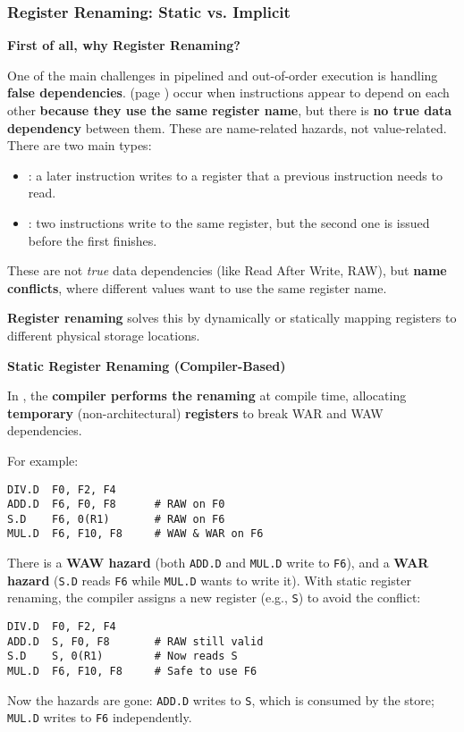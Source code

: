 \subsubsection{Register Renaming: Static vs. Implicit}\label{subsubsection: static vs implicit register renaming}

\begin{flushleft}
    \textcolor{Green3}{ \textbf{First of all, why Register Renaming?}}
\end{flushleft}
One of the main challenges in pipelined and out-of-order execution is handling \textbf{false dependencies}.  (page \pageref{subsubsection: Name Dependencies}) occur when instructions appear to depend on each other \textbf{because they use the same register name}, but there is \textbf{no true data dependency} between them. These are name-related hazards, not value-related. There are two main types:
\begin{itemize}
    \item {}: a later instruction writes to a register that a previous instruction needs to read.
    \item {}: two instructions write to the same register, but the second one is issued before the first finishes.
\end{itemize}
These are not \emph{true} data dependencies (like Read After Write, RAW), but \textbf{name conflicts}, where different values want to use the same register name.

\highspace
\textcolor{Green3}{ \textbf{Register renaming}} solves this by dynamically or statically mapping registers to different physical storage locations.

\highspace
\begin{flushleft}
    \textcolor{Red2}{ \textbf{Static Register Renaming (Compiler-Based)}}
\end{flushleft}
In , the \textbf{compiler performs the renaming} at compile time, allocating \textbf{temporary} (non-architectural) \textbf{registers} to break WAR and WAW dependencies.

\highspace
For example:
\begin{lstlisting}[language=unknown]
DIV.D  F0, F2, F4
ADD.D  F6, F0, F8      # RAW on F0
S.D    F6, 0(R1)       # RAW on F6
MUL.D  F6, F10, F8     # WAW & WAR on F6
\end{lstlisting}
There is a \textbf{WAW hazard} (both \texttt{ADD.D} and \texttt{MUL.D} write to \texttt{F6}), and a \textbf{WAR hazard} (\texttt{S.D} reads \texttt{F6} while \texttt{MUL.D} wants to write it). With static register renaming, the compiler assigns a new register (e.g., \texttt{S}) to avoid the conflict:
\begin{lstlisting}[language=unknown]
DIV.D  F0, F2, F4
ADD.D  S, F0, F8       # RAW still valid
S.D    S, 0(R1)        # Now reads S
MUL.D  F6, F10, F8     # Safe to use F6
\end{lstlisting}
Now the hazards are gone: \texttt{ADD.D} writes to \texttt{S}, which is consumed by the store; \texttt{MUL.D} writes to \texttt{F6} independently.

